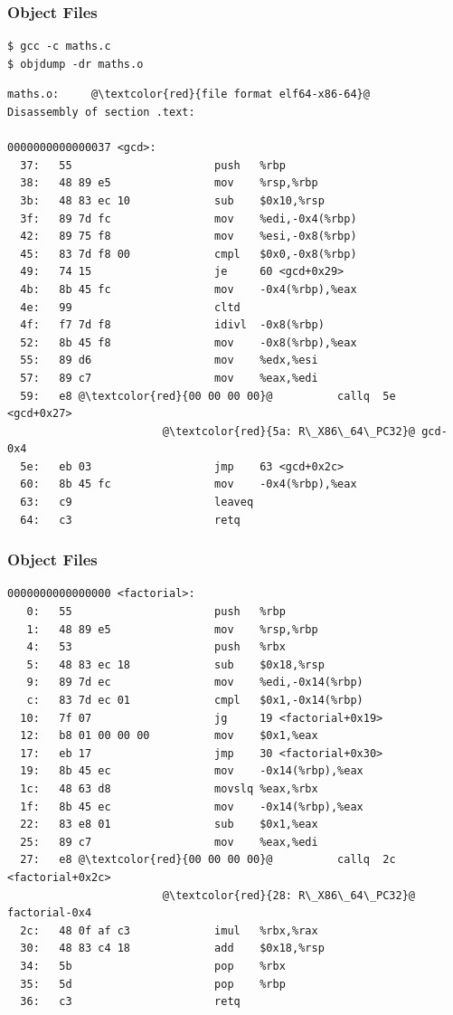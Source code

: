 \documentclass{beamer}
\begin{document}
\begin{frame}[fragile]
\frametitle{Object Files}
\tiny
\begin{verbatim}
$ gcc -c maths.c
$ objdump -dr maths.o
\end{verbatim}
\begin{lstlisting}[numbers=none]
maths.o:     @\textcolor{red}{file format elf64-x86-64}@
Disassembly of section .text:

0000000000000037 <gcd>:
  37:	55                      push   %rbp
  38:	48 89 e5                mov    %rsp,%rbp
  3b:	48 83 ec 10             sub    $0x10,%rsp
  3f:	89 7d fc                mov    %edi,-0x4(%rbp)
  42:	89 75 f8                mov    %esi,-0x8(%rbp)
  45:	83 7d f8 00             cmpl   $0x0,-0x8(%rbp)
  49:	74 15                   je     60 <gcd+0x29>
  4b:	8b 45 fc                mov    -0x4(%rbp),%eax
  4e:	99                      cltd
  4f:	f7 7d f8                idivl  -0x8(%rbp)
  52:	8b 45 f8                mov    -0x8(%rbp),%eax
  55:	89 d6                   mov    %edx,%esi
  57:	89 c7                   mov    %eax,%edi
  59:	e8 @\textcolor{red}{00 00 00 00}@          callq  5e <gcd+0x27>
                        @\textcolor{red}{5a: R\_X86\_64\_PC32}@	gcd-0x4
  5e:	eb 03                   jmp    63 <gcd+0x2c>
  60:	8b 45 fc                mov    -0x4(%rbp),%eax
  63:	c9                      leaveq
  64:	c3                      retq
\end{lstlisting}

\end{frame}

\begin{frame}[fragile]
\frametitle{Object Files}
\tiny
\begin{lstlisting}[numbers=none]
0000000000000000 <factorial>:
   0:	55                      push   %rbp
   1:	48 89 e5                mov    %rsp,%rbp
   4:	53                      push   %rbx
   5:	48 83 ec 18             sub    $0x18,%rsp
   9:	89 7d ec                mov    %edi,-0x14(%rbp)
   c:	83 7d ec 01             cmpl   $0x1,-0x14(%rbp)
  10:	7f 07                   jg     19 <factorial+0x19>
  12:	b8 01 00 00 00          mov    $0x1,%eax
  17:	eb 17                   jmp    30 <factorial+0x30>
  19:	8b 45 ec                mov    -0x14(%rbp),%eax
  1c:	48 63 d8                movslq %eax,%rbx
  1f:	8b 45 ec                mov    -0x14(%rbp),%eax
  22:	83 e8 01                sub    $0x1,%eax
  25:	89 c7                   mov    %eax,%edi
  27:	e8 @\textcolor{red}{00 00 00 00}@          callq  2c <factorial+0x2c>
                        @\textcolor{red}{28: R\_X86\_64\_PC32}@	factorial-0x4
  2c:	48 0f af c3             imul   %rbx,%rax
  30:	48 83 c4 18             add    $0x18,%rsp
  34:	5b                      pop    %rbx
  35:	5d                      pop    %rbp
  36:	c3                      retq
\end{lstlisting}

\end{frame}
\end{document}
